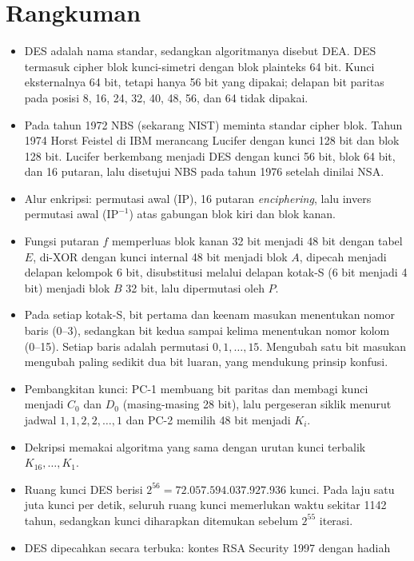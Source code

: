 \section{Rangkuman}
\begin{itemize}
    \item DES adalah nama standar, sedangkan algoritmanya disebut DEA. DES
    termasuk cipher blok kunci-simetri dengan blok plainteks 64 bit. Kunci
    eksternalnya 64 bit, tetapi hanya 56 bit yang dipakai; delapan bit paritas
    pada posisi 8, 16, 24, 32, 40, 48, 56, dan 64 tidak dipakai.
    \item Pada tahun 1972 NBS (sekarang NIST) meminta standar cipher blok.
    Tahun 1974 Horst Feistel di IBM merancang Lucifer dengan kunci 128 bit dan
    blok 128 bit. Lucifer berkembang menjadi DES dengan kunci 56 bit, blok
    64 bit, dan 16 putaran, lalu disetujui NBS pada tahun 1976 setelah dinilai
    NSA.
    \item Alur enkripsi: permutasi awal (IP), 16 putaran \textit{enciphering},
    lalu invers permutasi awal ($\text{IP}^{-1}$) atas gabungan blok kiri dan
    blok kanan.
    \item Fungsi putaran $f$ memperluas blok kanan 32 bit menjadi 48 bit dengan
    tabel $E$, di-XOR dengan kunci internal 48 bit menjadi blok $A$, dipecah
    menjadi delapan kelompok 6 bit, disubstitusi melalui delapan kotak-S
    (6 bit menjadi 4 bit) menjadi blok $B$ 32 bit, lalu dipermutasi oleh $P$.
    \item Pada setiap kotak-S, bit pertama dan keenam masukan menentukan nomor
    baris (0--3), sedangkan bit kedua sampai kelima menentukan nomor kolom
    (0--15). Setiap baris adalah permutasi $0, 1, \dots, 15$. Mengubah satu bit
    masukan mengubah paling sedikit dua bit luaran, yang mendukung prinsip
    konfusi.
    \item Pembangkitan kunci: PC-1 membuang bit paritas dan membagi kunci
    menjadi $C_0$ dan $D_0$ (masing-masing 28 bit), lalu pergeseran siklik
    menurut jadwal $1,1,2,2,\dots,1$ dan PC-2 memilih 48 bit menjadi $K_i$.
    \item Dekripsi memakai algoritma yang sama dengan urutan kunci terbalik
    $K_{16}, \dots, K_1$.
    \item Ruang kunci DES berisi $2^{56} = 72.057.594.037.927.936$ kunci. Pada
    laju satu juta kunci per detik, seluruh ruang kunci memerlukan waktu sekitar
    1142 tahun, sedangkan kunci diharapkan ditemukan sebelum $2^{55}$ iterasi.
    \item DES dipecahkan secara terbuka: kontes RSA Security 1997 dengan hadiah

\end{itemize}
